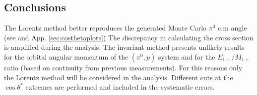 \subsection{Conclusions}
The Lorentz method better reproduces the generated Monte Carlo $\pi^0$ c.m angle (see  and App. \ref{sec:costhetaplots}) 
The discrepancy in calculating the cross section is amplified during the analysis. The invariant method presents unlikely results for 
the orbital angular momentum of the $(\pi^0,p)$ system and for the $E_{1+}/M_{1+}$ ratio (based on continuity from previous measurements).
For this reasons only the Lorentz method will be considered in the analysis. Different cuts at the $\cos\theta^*$ extremes
are performed and included in the systematic errors.
\cia









